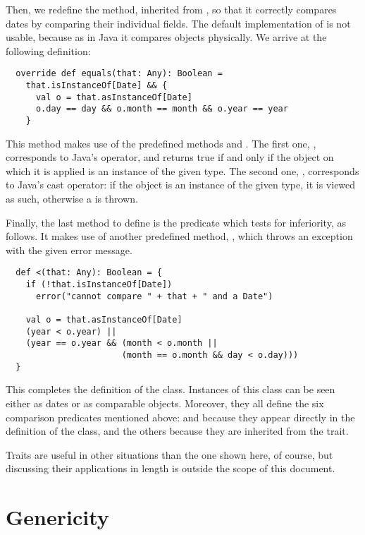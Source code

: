 \documentclass[a4paper,12pt,twoside,titlepage]{article}
\newcommand{\langname}[1]{#1\xspace}
\newcommand{\Java}{\langname{Java}}
\begin{document}
Then, we redefine the  method, inherited from
, so that it correctly compares dates by comparing their
individual fields. The default implementation of  is not
usable, because as in \Java it compares objects physically. We arrive
at the following definition:
\begin{lstlisting}
  override def equals(that: Any): Boolean =
    that.isInstanceOf[Date] && {
      val o = that.asInstanceOf[Date]
      o.day == day && o.month == month && o.year == year
    }
\end{lstlisting}
This method makes use of the predefined methods 
and . The first one, ,
corresponds to \Java's  operator, and returns true
if and only if the object on which it is applied is an instance of the
given type. The second one, , corresponds to
\Java's cast operator: if the object is an instance of the given type,
it is viewed as such, otherwise a  is
thrown.

Finally, the last method to define is the predicate which tests for
inferiority, as follows. It makes use of another predefined method,
, which throws an exception with the given error message.
\begin{lstlisting}
  def <(that: Any): Boolean = {
    if (!that.isInstanceOf[Date])
      error("cannot compare " + that + " and a Date")

    val o = that.asInstanceOf[Date]
    (year < o.year) ||
    (year == o.year && (month < o.month ||
                       (month == o.month && day < o.day)))
  }
\end{lstlisting}
This completes the definition of the  class. Instances of
this class can be seen either as dates or as comparable objects.
Moreover, they all define the six comparison predicates mentioned
above:  and \code{<} because they appear directly in
the definition of the  class, and the others because they
are inherited from the  trait.

Traits are useful in other situations than the one shown here, of
course, but discussing their applications in length is outside the
scope of this document.

\section{Genericity}
\label{sec:genericity}
\end{document}
